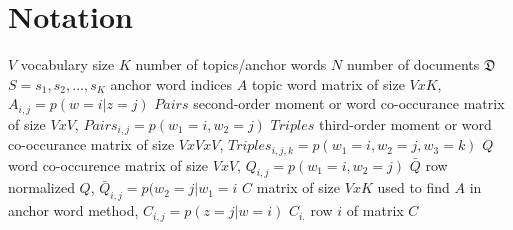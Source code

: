 \section{Notation}
$V$	vocabulary size
$K$	number of topics/anchor words
$N$    number of documents
$\mathfrak{D} $
$S =s_1,s_2,\ldots,s_K$	anchor word indices
$A$	topic word matrix of size $VxK$, $A_{i,j} = p(w=i|z=j)$
$Pairs$ second-order moment or word co-occurance matrix of size $VxV$, $Pairs_{i,j} = p(w_1=i,w_2=j)$
$Triples$ third-order moment or word co-occurance matrix of size $VxVxV$, $Triples_{i,j,k} = p(w_1=i,w_2=j,w_3=k)$
$Q$	word co-occurence matrix of size $VxV$, $Q_{i,j} = p(w_1=i,w_2=j)$
$\bar{Q}$	row normalized $Q$, $\bar{Q}_{i,j} = p(w_2=j|w_1=i$
$C$	matrix of size $VxK$ used to find $A$ in anchor word method, $C_{i,j} = p(z=j|w=i)$
$C_{i.}$	row $i$ of matrix $C$

